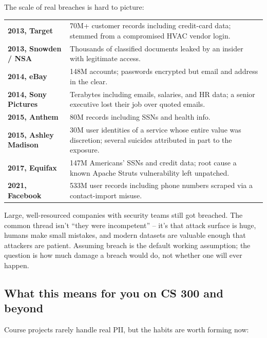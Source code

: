 \documentclass[11pt]{article}
\begin{document}
The scale of real breaches is hard to picture:

\begin{center}
\small
\begin{tabular}{p{2.2cm} p{9.8cm}}
\hline
\textbf{2013, Target} & 70M+ customer records including credit-card
data; stemmed from a compromised HVAC vendor login. \\
\textbf{2013, Snowden / NSA} & Thousands of classified documents
leaked by an insider with legitimate access. \\
\textbf{2014, eBay} & 148M accounts; passwords encrypted but email
and address in the clear. \\
\textbf{2014, Sony Pictures} & Terabytes including emails, salaries,
and HR data; a senior executive lost their job over quoted emails. \\
\textbf{2015, Anthem} & 80M records including SSNs and health info. \\
\textbf{2015, Ashley Madison} & 30M user identities of a service
whose entire value was discretion; several suicides attributed in
part to the exposure. \\
\textbf{2017, Equifax} & 147M Americans' SSNs and credit data; root
cause a known Apache Struts vulnerability left unpatched. \\
\textbf{2021, Facebook} & 533M user records including phone numbers
scraped via a contact-import misuse. \\
\hline
\end{tabular}
\normalsize
\end{center}

\begin{notebox}
Large, well-resourced companies with security teams still got
breached. The common thread isn't ``they were incompetent'' -- it's
that attack surface is huge, humans make small mistakes, and modern
datasets are valuable enough that attackers are patient. Assuming
breach is the default working assumption; the question is how much
damage a breach would do, not whether one will ever happen.
\end{notebox}

\subsection{What this means for you on CS 300 and beyond}

Course projects rarely handle real PII, but the habits are worth
forming now:
\end{document}
